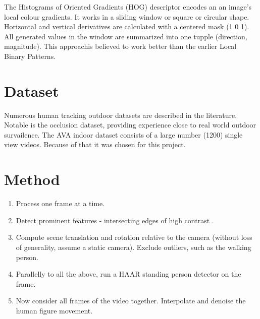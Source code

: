 \documentclass{article}
\begin{document}
The Histograms of Oriented Gradients (HOG)\cite{hog} descriptor encodes an an image's local colour gradients.
It works in a sliding window or square or circular shape.
Horizontal and vertical derivatives are calculated with a centered mask (1 0 1).
All generated values in the window are summarized into one tupple (direction, magnitude).
This approachis believed to work better than the earlier Local Binary Patterns.


\section{Dataset}
Numerous human tracking outdoor datasets are described in the literature\cite{datasets0}\cite{datasets1}.
Notable is the occlusion dataset\cite{datasets2}, providing experience close to real world outdoor survailence.
The AVA indoor dataset\cite{ava} consists of a large number (1200) single view videos.
Because of that it was chosen for this project.



\section{Method}
\begin{enumerate}
\item{Process one frame at a time.}
\item{Detect prominent features - intersecting edges of high contrast .}
\item{Compute scene translation and rotation relative to the camera (without loss of generality, assume a static camera). Exclude outliers, such as the walking person.}
\item{Parallelly to all the above, run a HAAR standing person detector on the frame.}
\item{Now consider all frames of the video together. Interpolate and denoise the human figure movement.}
\end{enumerate}


\printbibliography
\end{document}
